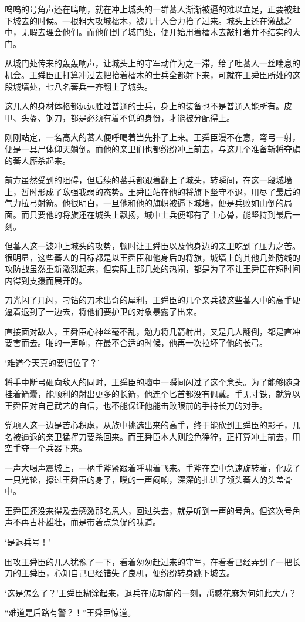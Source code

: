呜呜的号角声还在鸣响，就在冲上城头的一群蕃人渐渐被逼的难以立足，正要被赶下城去的时候。一根粗大攻城檑木，被几十人合力抬了过来。城头上还在激战之中，无暇去理会他们。而他们到了城门处，便开始用着檑木去敲打着并不结实的大门。

从城门处传来的轰轰响声，让城头上的守军动作为之一滞，给了吐蕃人一丝喘息的机会。王舜臣正打算冲过去把抬着檑木的士兵全都射下来，可就在王舜臣所处的这段城墙处，七八名蕃兵一齐翻上了城头。

这几人的身材体格都远远胜过普通的士兵，身上的装备也不是普通人能所有。皮甲、头盔、钢刀，都是必须有着不低的身份，才能被分配得上。

刚刚站定，一名高大的蕃人便呼喝着当先扑了上来。王舜臣漫不在意，弯弓一射，便是一具尸体仰天躺倒。而他的亲卫们也都纷纷冲上前去，与这几个准备斩将夺旗的蕃人厮杀起来。

前方虽然受到的阻碍，但后续的蕃兵都跟着翻上了城头，转瞬间，在这一段城墙上，暂时形成了敌强我弱的态势。王舜臣站在他的将旗下坚守不退，用尽了最后的气力拉弓射箭。他很明白，一旦他和他的旗帜被逼下城墙，便是兵败如山倒的局面。而只要他的将旗还在城头上飘扬，城中士兵便都有了主心骨，能坚持到最后一刻。

但蕃人这一波冲上城头的攻势，顿时让王舜臣以及他身边的亲卫吃到了压力之苦。很明显，这些蕃人的目标都是以王舜臣和他身后的将旗，城墙上的其他几处防线的攻防战虽然重新激烈起来，但实际上那几处的热闹，都是为了不让王舜臣在短时间内得到支援而展开的。

刀光闪了几闪，刁钻的刀术出奇的犀利，王舜臣的几个亲兵被这些蕃人中的高手硬逼着退到了一边去，将他们要护卫的对象暴露了出来。

直接面对敌人，王舜臣心神丝毫不乱，勉力将几箭射出，又是几人翻倒，都是直冲要害而去。啪的一声响，在最不合适的时候，他再一次拉坏了他的长弓。

‘难道今天真的要归位了？’

将手中断弓砸向敌人的同时，王舜臣的脑中一瞬间闪过了这个念头。为了能够随身挂着箭囊，能顺利的射出更多的长箭，他连个匕首都没有佩戴。手无寸铁，就算以王舜臣对自己武艺的自信，也不能保证他能击败眼前的手持长刀的对手。

党项人这一边是苦心积虑，从族中挑选出来的高手，终于能砍到王舜臣的影子，几名被逼退的亲卫猛挥刀要杀回来。而王舜臣本人则脸色狰狞，正打算冲上前去，用空手夺一个兵器下来。

一声大喝声震城上，一柄手斧紧跟着呼啸着飞来。手斧在空中急速旋转着，化成了一只光轮，擦过王舜臣的身子，噗的一声闷响，深深的扎进了领头蕃人的头盖骨中。

王舜臣还没来得及去感激那名恩人，回过头去，就是听到一声的号角。但这次号角声不再古朴雄壮，而是带着点急促的味道。

‘是退兵号！’

围攻王舜臣的几人犹豫了一下，看着匆匆赶过来的守军，在看看已经弄到了一把长刀的王舜臣，心知自己已经错失了良机，便纷纷转身跳下城去。

‘这是怎么了？’王舜臣糊涂起来，退兵在成功前的一刻，禹臧花麻为何如此大方？

“难道是后路有警？！”王舜臣惊道。

